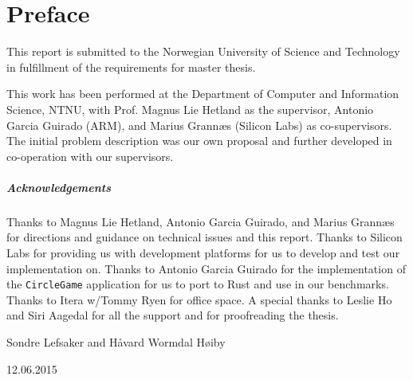
\newcommand\textbox[1]{%
  \parbox{.45\textwidth}{#1}%
}

\chapter{Preface}
\label{chap:preface}

This report is submitted to the Norwegian University of Science and Technology in fulfillment of the requirements for master thesis.

This work has been performed at the Department of Computer and Information Science, NTNU, with Prof. Magnus Lie Hetland as the supervisor, Antonio Garcia Guirado (ARM), and Marius Grannæs (Silicon Labs) as co-supervisors.
The initial problem description was our own proposal and further developed in co-operation with our supervisors.

\paragraph{Acknowledgements} \hfill

Thanks to Magnus Lie Hetland, Antonio Garcia Guirado, and Marius Grannæs for directions and guidance on technical issues and this report.
Thanks to Silicon Labs for providing us with development platforms for us to develop and test our implementation on.
Thanks to Antonio Garcia Guirado for the implementation of the \texttt{CircleGame} application for us to port to Rust and use in our benchmarks.
Thanks to Itera w/Tommy Ryen for office space.
A special thanks to Leslie Ho and Siri Aagedal for all the support and for proofreading the thesis.

\hfill \break

Sondre Lefsaker and Håvard Wormdal Høiby \textbox{\hfill 12.06.2015}
